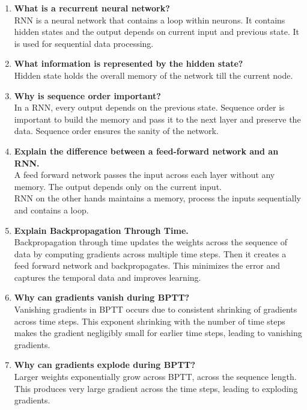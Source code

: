 \documentclass[10pt]{article}
\begin{document}
\begin{enumerate}
\item \textbf{What is a recurrent neural network?}\\
RNN is a neural network that contains a loop within neurons. It contains hidden states and the output depends on current input and previous state. It is used for sequential data processing. 

\item \textbf{What information is represented by the hidden state?}\\
Hidden state holds the overall memory of the network till the current node.

\item \textbf{Why is sequence order important?}\\
In a RNN, every output depends on the previous state. Sequence order is important to build the memory and pass it to the next layer and preserve the data. Sequence order ensures the sanity of the network. 

\item \textbf{Explain the difference between a feed-forward network and an RNN.}\\
A feed forward network passes the input across each layer without any memory. The output depends only on the current input.
\\RNN on the other hands maintains a memory, process the inputs sequentially and contains a loop.

\item \textbf{Explain Backpropagation Through Time.}\\
Backpropagation through time updates the weights across the sequence of data by computing gradients across multiple time steps. Then it creates a feed forward network and backpropagates. This minimizes the error and captures the temporal data and improves learning. 

\item \textbf{Why can gradients vanish during BPTT?}\\
Vanishing gradients in BPTT occurs due to consistent shrinking of gradients across time steps. This exponent shrinking with the number of time steps makes the gradient negligibly small for earlier time steps, leading to vanishing gradients.

\item \textbf{Why can gradients explode during BPTT?}\\
Larger weights exponentially grow across BPTT, across the sequence length. This produces very large gradient across the time steps, leading to exploding gradients.


\end{enumerate}
\end{document}
